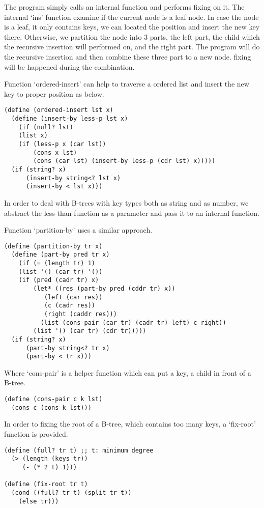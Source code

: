 \documentclass{article}
\begin{document}
The program simply calls an internal function and performs fixing
on it. The internal `ins' function examine if the current node
is a leaf node. In case the node is a leaf, it only contains keys,
we can located the position and insert the new key there. Otherwise,
we partition the node into 3 parts, the left part, the child which
the recursive insertion will performed on, and the right part.
The program will do the recursive insertion and then combine
these three part to a new node. fixing will be happened during the
combination.

Function `ordered-insert' can help to traverse a ordered list
and insert the new key to proper position as below.

\begin{lstlisting}
(define (ordered-insert lst x)
  (define (insert-by less-p lst x)
    (if (null? lst)
	(list x)
	(if (less-p x (car lst))
	    (cons x lst)
	    (cons (car lst) (insert-by less-p (cdr lst) x)))))
  (if (string? x)
      (insert-by string<? lst x)
      (insert-by < lst x)))
\end{lstlisting}

In order to deal with B-trees with key types both as string and
as number, we abstract the less-than function as a parameter
and pass it to an internal function.

Function `partition-by' uses a similar approach.

\begin{lstlisting}
(define (partition-by tr x)
  (define (part-by pred tr x)
    (if (= (length tr) 1)
	(list '() (car tr) '())
	(if (pred (cadr tr) x)
	    (let* ((res (part-by pred (cddr tr) x))
		   (left (car res))
		   (c (cadr res))
		   (right (caddr res)))
	      (list (cons-pair (car tr) (cadr tr) left) c right))
	    (list '() (car tr) (cdr tr)))))
  (if (string? x)
      (part-by string<? tr x)
      (part-by < tr x)))
\end{lstlisting}

Where `cons-pair' is a helper function which can put a key, a
child in front of a B-tree.

\begin{lstlisting}
(define (cons-pair c k lst)
  (cons c (cons k lst)))
\end{lstlisting}

In order to fixing the root of a B-tree, which contains too many
keys, a `fix-root' function is provided.

\begin{lstlisting}
(define (full? tr t) ;; t: minimum degree
  (> (length (keys tr))
     (- (* 2 t) 1)))

(define (fix-root tr t)
  (cond ((full? tr t) (split tr t))
	(else tr)))
\end{lstlisting}
\end{document}
